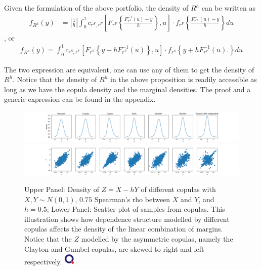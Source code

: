 \begin{prop} Given the formulation of the above portfolio, the density of $R^h$ can be written as
  \begin{align}
  f_{R^h}(y) &= \left|\frac{1}{h}\right|\int_0^1 c_{r^S, r^F} \left[
  F_{r^F}\left\{\frac{F^{-1}_{r^S}(u)-y}{h}\right\}, u
  \right]
   \cdot
  f_{r^F}
  \left\{\frac{F^{-1}_{r^S}(u)-y}{h}\right\} du \label{eq:density1}
  \end{align}, or
    \begin{align}
      f_{R^h}(y)
      = \int_0^1 c_{r^S, r^F} \left[
      F_{r^S}\left\{y + h F^{-1}_{r^F}(u)\right\}, u
      \right]
       \cdot
      f_{r^S}
      \left\{
      y+ hF^{-1}_{r^F}(u).
      \right\} du\label{eq:density2}
  \end{align}
  \end{prop}
The two expression are equivalent, one can use any of them to get the density of $R^h$.
Notice that the density of $R^h$ in the above proposition is readily accessible as long as we have
the copula density and the marginal densities.
The proof and a generic expression can be found in the appendix.
\begin{figure}[h]
\includegraphics[width=\textwidth]{_pics/density illustration1.png}
\includegraphics[width=\textwidth]{_pics/density illustration2.png}
  \caption{Upper Panel: Density of $Z= X - hY$ of different copulas with
  $X, Y \sim N(0,1)$,
  $0.75$ Spearman's rho between $X$ and $Y$, and $h=0.5$;
  Lower Panel: Scatter plot of samples from copulas.
  This illustration shows how dependence structure modelled by different copulas affects the density of the linear combination
  of margins.
  Notice that the $Z$ modelled by the asymmetric copulas, namely the Clayton and Gumbel copulas, are skewed to right
  and left respectively. \href{http://www.quantlet.com/}{\includegraphics[width=15pt]{_pics/qletlogo_tr.png}}}
\label{fig:density illustration}
\end{figure}

